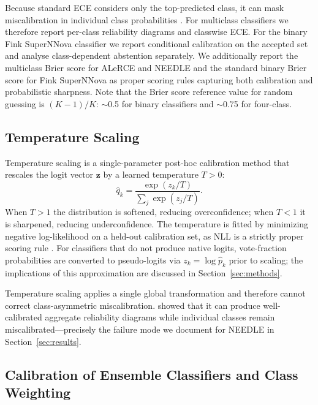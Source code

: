 \documentclass[twocolumn]{aastex631}
\begin{document}
Because standard ECE considers only the top-predicted class, it
can mask miscalibration in individual class probabilities
\citep{nixon2019}. For multiclass classifiers we therefore report
per-class reliability diagrams and classwise ECE. For the binary
Fink SuperNNova classifier we report conditional calibration on
the accepted set and analyse class-dependent abstention separately.
We additionally report the multiclass Brier score \citep{brier1950}
for ALeRCE and NEEDLE and the standard binary Brier score for
Fink SuperNNova as proper scoring rules capturing both calibration
and probabilistic sharpness. Note that the Brier score reference
value for random guessing is $(K-1)/K$: $\sim$0.5 for binary
classifiers and $\sim$0.75 for four-class.

\subsection{Temperature Scaling}\label{sec:tempscaling}

Temperature scaling \citep{guo2017} is a single-parameter post-hoc
calibration method that rescales the logit vector $\mathbf{z}$ by
a learned temperature $T > 0$:
%
\begin{equation}
    \hat{q}_k = \frac{\exp(z_k/T)}{\sum_j \exp(z_j/T)}.
    \label{eq:tempscaling}
\end{equation}
%
When $T > 1$ the distribution is softened, reducing overconfidence;
when $T < 1$ it is sharpened, reducing underconfidence. The
temperature is fitted by minimizing negative log-likelihood on a
held-out calibration set, as NLL is a strictly proper scoring rule
\citep{gneiting2007}. For classifiers that do not produce native
logits, vote-fraction probabilities are converted to pseudo-logits
via $z_k = \log \hat{p}_k$ prior to scaling; the implications of
this approximation are discussed in Section~\ref{sec:methods}.

Temperature scaling applies a single global transformation and
therefore cannot correct class-asymmetric miscalibration.
\citet{kull2019} showed that it can produce well-calibrated
aggregate reliability diagrams while individual classes remain
miscalibrated---precisely the failure mode we document for NEEDLE
in Section~\ref{sec:results}.

\subsection{Calibration of Ensemble Classifiers and Class
Weighting}\label{sec:rfcalib}
\end{document}
